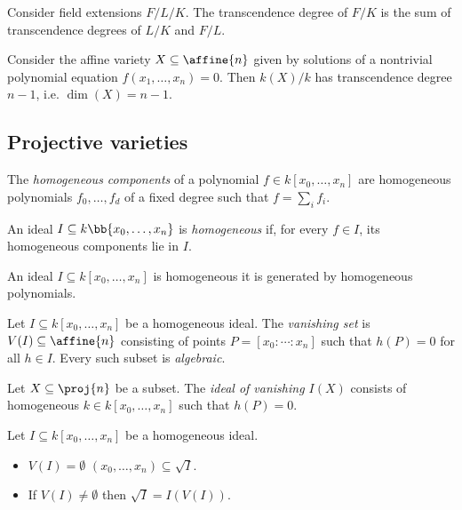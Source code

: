 \documentclass{article}
\begin{document}
\begin{proposition}
  Consider field extensions $F/L/K$. The transcendence degree of $F/K$ is the sum of
  transcendence degrees of $L/K$ and $F/L$.
\end{proposition}

\begin{proposition}
  Consider the affine variety $X\subseteq\affine{n}$ given by solutions of a nontrivial
  polynomial equation $f(x_1,\ldots,x_n)=0$. Then $k(X)/k$ has transcendence degree $n-1$,
  i.e. $\dim(X)=n-1$.
\end{proposition}

\subsection{Projective varieties}

\begin{definition}
  The \emph{homogeneous components} of a polynomial $f\in k[x_0,\ldots,x_n]$ are
  homogeneous polynomials $f_0,\ldots,f_d$ of a fixed degree such that $f = \sum_i f_i$.

  An ideal $I\subseteq k\bb{x_0,\ldots,x_n}$ is \emph{homogeneous} if, for every $f\in I$,
  its homogeneous components lie in $I$.
\end{definition}

\begin{lemma}
  An ideal $I\subseteq k[x_0,\ldots,x_n]$ is homogeneous \iff{} it is generated by homogeneous
  polynomials.
\end{lemma}

\begin{definition}
  Let $I\subseteq k[x_0,\ldots,x_n]$ be a homogeneous ideal. The \emph{vanishing set}
  is $V(I)\subseteq\affine{n}$ consisting of points $P=[x_0 : \cdots : x_n]$ such that
  $h(P)=0$ for all $h\in I$. Every such subset is \emph{algebraic}.
\end{definition}

\begin{definition}
  Let $X\subseteq\proj{n}$ be a subset. The \emph{ideal of vanishing $I(X)$} consists of
  homogeneous $k\in k[x_0,\ldots,x_n]$ such that $h(P)=0$.
\end{definition}

\begin{theorem}
  Let $I\subseteq k[x_0,\ldots,x_n]$ be a homogeneous ideal.
  \begin{itemize}
    \item $V(I)=\emptyset$ \iff{} $(x_0,\ldots,x_n)\subseteq\sqrt I$.
    \item If $V(I)\neq\emptyset$ then $\sqrt I = I(V(I))$.
  \end{itemize}
\end{theorem}
\end{document}
